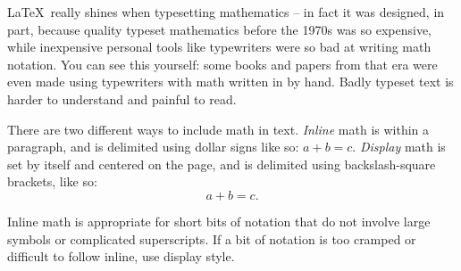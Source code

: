 \documentclass{article}
\begin{document}
\LaTeX\ really shines when typesetting mathematics -- in fact it was designed, in part, because quality typeset mathematics before the 1970s was so expensive, while inexpensive personal tools like typewriters were so bad at writing math notation. You can see this yourself: some books and papers from that era were even made using typewriters with math written in by hand. Badly typeset text is harder to understand and painful to read.

There are two different ways to include math in text. \emph{Inline} math is within a paragraph, and is delimited using dollar signs like so: $a + b = c$. \emph{Display} math is set by itself and centered on the page, and is delimited using backslash-square brackets, like so: \[ a + b = c. \]

Inline math is appropriate for short bits of notation that do not involve large symbols or complicated superscripts. If a bit of notation is too cramped or difficult to follow inline, use display style.
\end{document}
